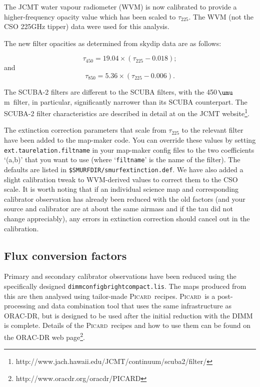 \documentclass[twoside,11pt]{article}
\newcommand{\micron}{\mbox{\,${\umu}$m}}            %
\newcommand{\htmladdnormallinkfoot}[2]{#1\footnote{#2}}
\newcommand{\xref}[3]{#1}
\renewcommand{\_}{\texttt{\symbol{95}}}
\newcommand{\picard}{\xref{\textsc{Picard}}{sun231}{}}
\newcommand{\param}[1]{\texttt{#1}}
\begin{document}
The JCMT water vapour radiometer (WVM) is now calibrated to provide a
higher-frequency opacity value which has been scaled to
$\tau_{225}$. The WVM (not the CSO 225GHz tipper) data were used for
this analysis.

The new filter opacities as determined from skydip data are as
follows:

\begin{equation}
\tau_{450} = 19.04 \times (\tau_{225} - 0.018);
\end{equation}
and
\begin{equation}
\tau_{850} = 5.36 \times (\tau_{225} - 0.006).
\end{equation}

The SCUBA-2 filters are different to the SCUBA filters, with the
450\micron\ filter, in particular, significantly narrower than its
SCUBA counterpart. The SCUBA-2 filter characteristics are described in
detail at
\htmladdnormallinkfoot{on the JCMT website}{http://www.jach.hawaii.edu/JCMT/continuum/scuba2/filter/}.

The extinction correction parameters that scale from $\tau_{225}$ to
the relevant filter have been added to the map-maker code. You can
override these values by setting \param{ext.taurelation.filtname} in
your map-maker config files to the two coefficients `(a,b)' that you
want to use (where `\texttt{filtname}' is the name of the filter). The
defaults are listed in \texttt{\$SMURF\_DIR/smurf\_extinction.def}. We have
also added a slight calibration tweak to WVM-derived values to correct
them to the CSO scale. It is worth noting that if an individual
science map and corresponding calibrator observation has already been
reduced with the old factors (and your source and calibrator are at
about the same airmass and if the tau did not change appreciably), any
errors in extinction correction should cancel out in the calibration.


\subsection{Flux conversion factors}
\label{sec:fcf}

Primary and secondary calibrator observations have been reduced using
the specifically designed
\texttt{dimmconfig\_bright\_compact.lis}. The maps produced from this
are then analysed using tailor-made \picard\ recipes. \picard\ is a
post-processing and data combination tool that uses the same
infrastructure as ORAC-DR, but is designed to be used after the
initial reduction with the DIMM is complete. Details of the \picard\
recipes and how to use them can be found on \htmladdnormallinkfoot{the
  ORAC-DR web page}{http://www.oracdr.org/oracdr/PICARD}.
\end{document}
